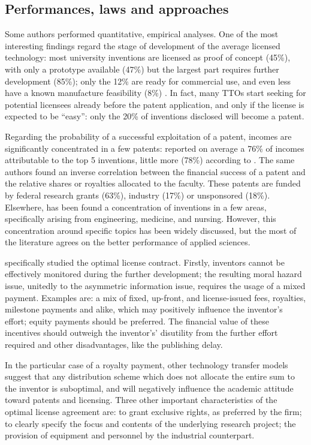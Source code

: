 \subsection{Performances, laws and approaches}

Some authors performed quantitative, empirical analyses. One of the most interesting findings regard the stage of development of the average licensed technology: most university inventions are licensed as proof of concept (45\%), with only a prototype available (47\%) but the largest part requires further development (85\%); only the 12\% are ready for commercial use, and even less have a known manufacture feasibility (8\%) \citep{Thursby2002}. In fact, many TTOs start seeking for potential licensees already before the patent application, and only if the license is expected to be \enquote{easy}: only the 20\% of inventions disclosed will become a patent.

Regarding the probability of a successful exploitation of a patent, incomes are significantly concentrated in a few patents: \citet{Thursby2002} reported on average a 76\% of incomes attributable to the top 5 inventions, little more (78\%) according to \citet{Jensen2003}. The same authors found an inverse correlation between the financial success of a patent and the relative shares or royalties allocated to the faculty. These patents are funded by federal research grants (63\%), industry (17\%) or unsponsored (18\%). Elsewhere, has been found a concentration of inventions in a few areas, specifically arising from engineering, medicine, and nursing. However, this concentration around specific topics has been widely discussed, but the most of the literature agrees on the better performance of applied sciences. 

\citet{Jensen2003} specifically studied the optimal license contract. Firstly, inventors cannot be effectively monitored during the further development; the resulting moral hazard issue, unitedly to the asymmetric information issue, requires the usage of a mixed payment. Examples are: a mix of fixed, up-front, and license-issued fees, royalties, milestone payments and alike, which may positively influence the inventor's effort; equity payments should be preferred. The financial value of these incentives should outweigh the inventor's' disutility from the further effort required and other disadvantages, like the publishing delay. 

In the particular case of a royalty payment, other technology transfer models suggest that any distribution scheme which does not allocate the entire sum to the inventor is suboptimal, and will negatively influence the academic attitude toward patents and licensing. Three other important characteristics of the optimal license agreement are: to grant exclusive rights, as preferred by the firm; to clearly specify the focus and contents of the underlying research project; the provision of equipment and personnel by the industrial counterpart. 

